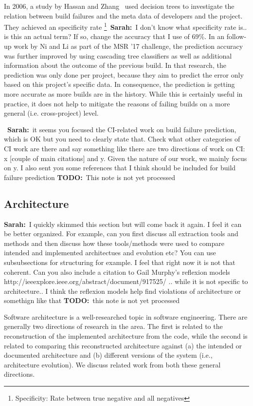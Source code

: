 \documentclass[sigplan, anonymous, review]{acmart}
\newcommand{\sn}[1]{{\color{blue}\textbf{Sarah:}~#1}}
\newcommand{\todo}[1]{{ \color{red} \textbf{TODO:}~#1}}
\begin{document}
In 2006, a study by Hassan and Zhang~\cite{Pred-Tree} used decision trees to investigate the relation between build failures and the meta data of developers and the project.
They achieved an specificity rate \footnote{Specificity: Rate between true negative and all negatives}~\sn{I don't know what specificity rate is.. is this an actual term? If so, change the accuracy that I use} of 69\%.
In an follow-up work by Ni and Li as part of the MSR '17 challenge, the prediction accuracy was further improved by using cascading tree classifiers as well as additional information about the outcome of the previous build\cite{Pred-Cascade}. 
In that research, the prediction was only done per project, because they aim to predict the error only based on this project's specific data. In consequence, the prediction is getting more accurate as more builds are in the history.
While this is certainly useful in practice, it does not help to mitigate the reasons of failing builds on a more general (i.e. cross-project) level.

~\sn{it seems you focused the CI-related work on build failure prediction, which is OK but you need to clearly state that. Check what other categories of CI work are there and say something like there are two directions of work on CI: x [couple of main citations] and y. Given the nature of our work, we mainly focus on y. I also sent you some references that I think should be included for build failure prediction} \todo{This note is not yet processed}

\subsection{Architecture}
\label{sec:relwork-arch}

\sn{I quickly skimmed this section but will come back it again. I feel it can be better organized. For example, can you first discuss all extraction tools and methods and then discuss how these tools/methods were used to compare intended and implemented architectues and evolution etc? You can use subsubsections for structuring for example. I feel that right  now it is not that coherent. Can you also include a citation to Gail Murphy's reflexion models http://ieeexplore.ieee.org/abstract/document/917525/ .. while it is not specific to architecture.. I think the reflexion models help find violations of architecture or somethign like that} \todo{this note is not yet processed}

Software architecture is a well-researched topic in software engineering.
There are generally two directions of research in the area.
The first is related to the reconstruction of the implemented architecture from the code, while the second is related to comparing this reconstructed architecture against (a) the intended or documented architecture and (b) different versions of the system (i.e., architecture evolution).
We discuss related work from both these general directions.
\end{document}
